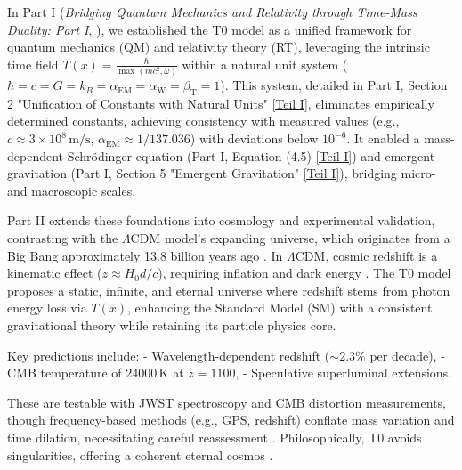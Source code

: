 \documentclass[twocolumn,aps,prl]{revtex4-2}
\newcommand{\Tfield}{T(x)}
\newcommand{\alphaEM}{\alpha_{\text{EM}}}
\newcommand{\alphaW}{\alpha_{\text{W}}}
\newcommand{\betaT}{\beta_{\text{T}}}
\newcommand{\LCDM}{\Lambda\text{CDM}}
\begin{document}
	In Part I (\textit{Bridging Quantum Mechanics and Relativity through Time-Mass Duality: Part I}, \cite{pascher_part1_2025}), we established the T0 model as a unified framework for quantum mechanics (QM) and relativity theory (RT), leveraging the intrinsic time field \(\Tfield = \frac{\hbar}{\max(mc^2, \omega)}\) within a natural unit system (\(\hbar = c = G = k_B = \alphaEM = \alphaW = \betaT = 1\)). This system, detailed in Part I, Section 2 "Unification of Constants with Natural Units" \href{https://github.com/jpascher/T0-Time-Mass-Duality/tree/main/2/pdf/English/Bridging Quantum Mechanics and Relativity through Time-Mass Duality Part I Theoretical Foundations_en.pdf}{[Teil I]}, eliminates empirically determined constants, achieving consistency with measured values (e.g., \(c \approx 3 \times 10^8 \, \text{m/s}\), \(\alphaEM \approx 1/137.036\)) with deviations below \(10^{-6}\). It enabled a mass-dependent Schrödinger equation (Part I, Equation (4.5) \href{https://github.com/jpascher/T0-Time-Mass-Duality/tree/main/2/pdf/English/Bridging Quantum Mechanics and Relativity through Time-Mass Duality Part I Theoretical Foundations_en.pdf}{[Teil I]}) and emergent gravitation (Part I, Section 5 "Emergent Gravitation" \href{https://github.com/jpascher/T0-Time-Mass-Duality/tree/main/2/pdf/English/Bridging Quantum Mechanics and Relativity through Time-Mass Duality Part I Theoretical Foundations_en.pdf}{[Teil I]}), bridging micro- and macroscopic scales.
	
	Part II extends these foundations into cosmology and experimental validation, contrasting with the \(\LCDM\) model’s expanding universe, which originates from a Big Bang approximately 13.8 billion years ago \cite{Planck2020}. In \(\LCDM\), cosmic redshift is a kinematic effect (\(z \approx H_0 d / c\)), requiring inflation and dark energy \cite{Riess1998,Perlmutter1999}. The T0 model proposes a static, infinite, and eternal universe where redshift stems from photon energy loss via \(\Tfield\), enhancing the Standard Model (SM) with a consistent gravitational theory while retaining its particle physics core.
	
	Key predictions include:
	- Wavelength-dependent redshift (\(\sim 2.3\%\) per decade),
	- CMB temperature of \(24000 \, \text{K}\) at \(z = 1100\),
	- Speculative superluminal extensions.
	
	These are testable with JWST spectroscopy and CMB distortion measurements, though frequency-based methods (e.g., GPS, redshift) conflate mass variation and time dilation, necessitating careful reassessment \cite{pascher_quantum_2025}. Philosophically, T0 avoids singularities, offering a coherent eternal cosmos \cite{pascher_perspective_2025}.
	
\end{document}
